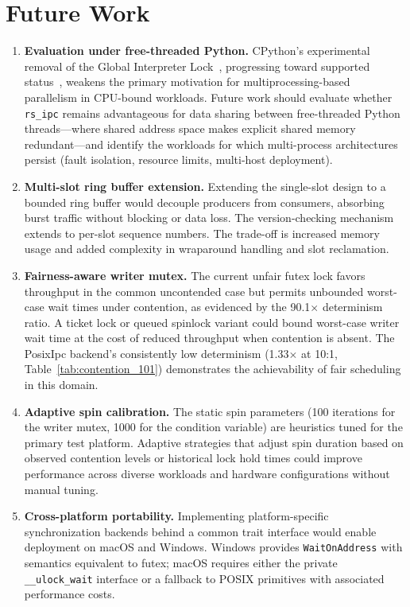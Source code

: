 \section{Future Work}

\begin{enumerate}
    \item \textbf{Evaluation under free-threaded Python.} CPython's experimental removal of the Global Interpreter Lock~\cite{pep703}, progressing toward supported status~\cite{pep779}, weakens the primary motivation for multiprocessing-based parallelism in CPU-bound workloads. Future work should evaluate whether \texttt{rs\_ipc} remains advantageous for data sharing between free-threaded Python threads---where shared address space makes explicit shared memory redundant---and identify the workloads for which multi-process architectures persist (fault isolation, resource limits, multi-host deployment).

    \item \textbf{Multi-slot ring buffer extension.} Extending the single-slot design to a bounded ring buffer would decouple producers from consumers, absorbing burst traffic without blocking or data loss. The version-checking mechanism extends to per-slot sequence numbers. The trade-off is increased memory usage and added complexity in wraparound handling and slot reclamation.

    \item \textbf{Fairness-aware writer mutex.} The current unfair futex lock favors throughput in the common uncontended case but permits unbounded worst-case wait times under contention, as evidenced by the 90.1$\times$ determinism ratio. A ticket lock or queued spinlock variant could bound worst-case writer wait time at the cost of reduced throughput when contention is absent. The PosixIpc backend's consistently low determinism (1.33$\times$ at 10:1, Table~\ref{tab:contention_101}) demonstrates the achievability of fair scheduling in this domain.

    \item \textbf{Adaptive spin calibration.} The static spin parameters (100 iterations for the writer mutex, 1000 for the condition variable) are heuristics tuned for the primary test platform. Adaptive strategies that adjust spin duration based on observed contention levels or historical lock hold times could improve performance across diverse workloads and hardware configurations without manual tuning.

    \item \textbf{Cross-platform portability.} Implementing platform-specific synchronization backends behind a common trait interface would enable deployment on macOS and Windows. Windows provides \texttt{WaitOnAddress} with semantics equivalent to futex; macOS requires either the private \texttt{\_\_ulock\_wait} interface or a fallback to POSIX primitives with associated performance costs.


\end{enumerate}
